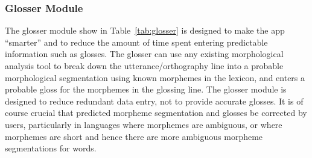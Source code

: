 \documentclass[12pt]{article}
\begin{document}
\subsubsection{Glosser Module}
The glosser module show in Table~\ref{tab:glosser} is designed to make the app ``smarter'' and to reduce the amount of time spent entering predictable information such as glosses. The glosser can use any existing morphological analysis tool to break down the utterance/orthography line  into a probable morphological segmentation using known morphemes in the lexicon, and enters a probable gloss for the morphemes in the glossing line. The glosser module is designed to reduce redundant data entry, not to provide accurate glosses. It is of course crucial that predicted morpheme segmentation and glosses be corrected by users, particularly in languages where morphemes are ambiguous, or where morphemes are short and hence there are more ambiguous morpheme segmentations for words. 
\end{document}
